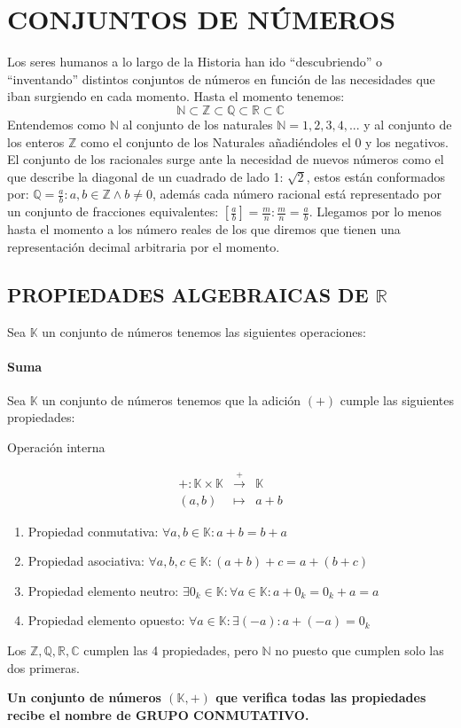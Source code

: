 \documentclass[10pt,a4paper,openright]{book}
\theoremstyle{break}
\begin{document}
\chapter{CONJUNTOS DE NÚMEROS}
Los seres humanos a lo largo de la Historia han ido ``descubriendo'' o  ``inventando'' distintos conjuntos de números en función de las necesidades que iban surgiendo en cada momento. Hasta el momento tenemos:
$$\mathbb N\subset \mathbb Z\subset \mathbb Q\subset \mathbb R\subset \mathbb C$$
Entendemos como $\mathbb N$ al conjunto de los naturales $\mathbb N={1,2,3,4,...}$ y al conjunto de los enteros $\mathbb Z$ como el conjunto de los Naturales añadiéndoles el 0 y los negativos. El conjunto de los  racionales surge ante la necesidad de nuevos números como el que describe la diagonal de un cuadrado de lado 1: $\sqrt{2}$, estos están conformados por: $\mathbb Q={\frac{a}{b}: a,b\in \mathbb Z \wedge b\neq 0}$, además cada número racional está representado por un conjunto de fracciones equivalentes: $[\frac{a}{b}]={\frac{m}{n}: \frac{m}{n}=\frac{a}{b}}$. Llegamos por lo menos hasta el momento a los número reales de los que diremos que tienen una representación decimal arbitraria por el momento.

\section{PROPIEDADES ALGEBRAICAS DE $\mathbb R$}
Sea $\mathbb K$ un conjunto de números tenemos las siguientes operaciones:
\subsubsection{Suma}
Sea $\mathbb K$ un conjunto de números tenemos que la adición $(+)$ cumple las siguientes propiedades:
\begin{center}
Operación interna
\end{center}
\begin{eqnarray*}
+: \mathbb K \times\mathbb K & \stackrel{+}{\rightarrow} & \mathbb K \\
(a,b) & \longmapsto  & a+b
\end{eqnarray*}

\begin{enumerate}
\item Propiedad conmutativa: $\forall a, b \in \mathbb K: a+b=b+a$
\item Propiedad asociativa: $\forall a, b, c\in \mathbb K : (a+b)+c=a+(b+c)$
\item Propiedad elemento neutro: $\exists 0_k\in \mathbb K : \forall a \in \mathbb K : a+0_k=0_k+a=a$
\item Propiedad elemento opuesto: $\forall a \in \mathbb K : \exists (-a) : a+(-a)=0_k$
\end{enumerate}
Los $\mathbb {Z, Q, R, C}$ cumplen las 4 propiedades, pero $\mathbb N$ no puesto que cumplen solo las dos primeras.\par
\textbf{Un conjunto de números $(\mathbb K, +)$ que verifica todas las propiedades recibe el nombre de GRUPO CONMUTATIVO.}
\end{document}
